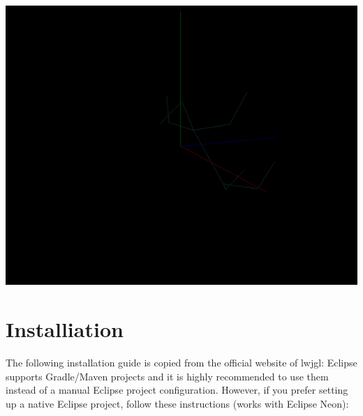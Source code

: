 \documentclass[a4paper, 11pt]{article}
\begin{document}
            \begin{center}
                \includegraphics[width = \textwidth]{Animation2-5.PNG}
            \end{center}

\section*{Installiation}
   \indent The following installation guide is copied from the official website of lwjgl: Eclipse supports Gradle/Maven projects and it is highly recommended to use them instead of a manual Eclipse project configuration. However, if you prefer setting up a native Eclipse project, follow these instructions (works with Eclipse Neon):
\end{document}
